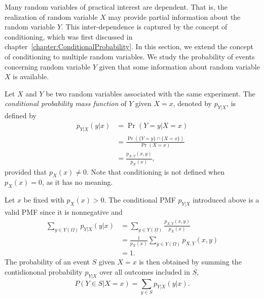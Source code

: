 Many random variables of practical interest are dependent.
That is, the realization of random variable $X$ may provide partial information about the random variable $Y$.
This inter-dependence is captured by the concept of conditioning, which was first discussed in chapter~\ref{chapter:ConditionalProbability}.
In this section, we extend the concept of conditioning to multiple random variables.
We study the probability of events concerning random variable $Y$ given that some information about random variable $X$ is available.

Let $X$ and $Y$ be two random variables associated with the same experiment.
The \emph{conditional probability mass function} of $Y$ given $X = x$, denoted by $p_{Y|X}$, is defined by
\begin{equation*}
\begin{split}
p_{Y|X} (y|x) &= \Pr ( Y = y | X = x) \\
&= \frac{\Pr (\{Y = y\} \cap \{ X = x \})}{\Pr (X = x)} \\
&= \frac{ p_{X,Y} (x,y) }{p_X(x)},
\end{split}
\end{equation*}
provided that $p_X (x) \neq 0$.
Note that conditioning is not defined when $p_X (x) = 0$, as it has no meaning.

Let $x$ be fixed with $p_X (x) > 0$.
The conditional PMF $p_{Y|X}$ introduced above is a valid PMF since it is nonnegative and
\begin{equation*}
\begin{split}
\sum_{y \in Y(\Omega)} p_{Y|X} (y|x)
&= \sum_{y \in Y(\Omega)} \frac{p_{X,Y} (x,y)}{p_X (x)} \\
&= \frac{1}{p_X (x)} \sum_{y \in Y(\Omega)} p_{X,Y} (x,y) \\
&= 1.
\end{split}
\end{equation*}
The probability of an event $S$ given $X = x$ is then obtained by summing the contidiononal probability $p_{Y|X}$ over all outcomes included in $S$,
\begin{equation*}
P (Y \in S | X = x) = \sum_{y \in S} p_{Y|X} (y | x) .
\end{equation*}

